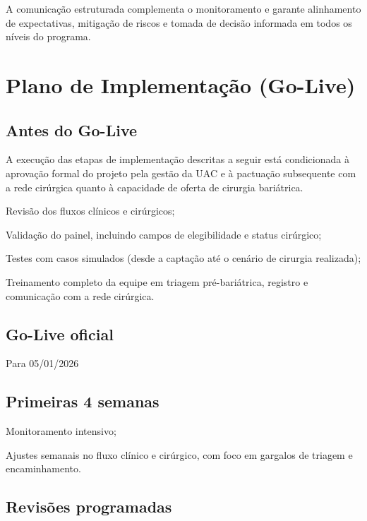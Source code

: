 \documentclass[12pt]{article}
\begin{document}
A comunicação estruturada complementa o monitoramento e garante alinhamento de expectativas, mitigação de riscos e tomada de decisão informada em todos os níveis do programa.

\FGVNewPage
\section{Plano de Implementação (Go-Live)}
\label{sec:org2c1de1c}
\subsection{Antes do Go-Live}
\label{sec:org0d8a90c}
A execução das etapas de implementação descritas a seguir está condicionada à aprovação formal do projeto pela gestão da UAC e à pactuação subsequente com a rede cirúrgica quanto à capacidade de oferta de cirurgia bariátrica.

\begin{hleveltwo}
\item Revisão dos fluxos clínicos e cirúrgicos;
\item Validação do painel, incluindo campos de elegibilidade e status cirúrgico;
\item Testes com casos simulados (desde a captação até o cenário de cirurgia realizada);
\item Treinamento completo da equipe em triagem pré-bariátrica, registro e comunicação com a rede cirúrgica.
\end{hleveltwo}

\subsection{Go-Live oficial}
\label{sec:org008573e}
Para 05/01/2026

\subsection{Primeiras 4 semanas}
\label{sec:orgb00ba44}
\begin{hleveltwo}
\item Monitoramento intensivo;
\item Ajustes semanais no fluxo clínico e cirúrgico, com foco em gargalos de triagem e encaminhamento.
\end{hleveltwo}

\subsection{Revisões programadas}
\label{sec:org7d6fea7}
\end{document}
